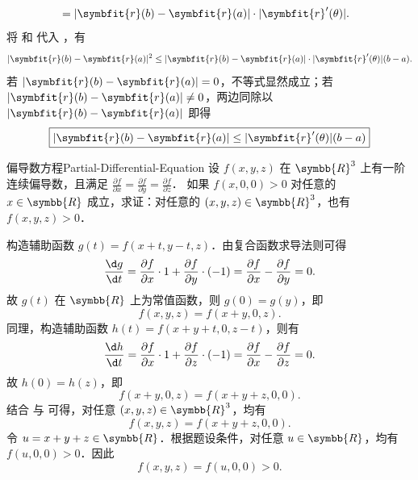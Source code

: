 \begin{myproof}
\begin{equation}
\begin{aligned}
                             & = |\symbfit{r}(b) - \symbfit{r}(a)| \cdot |\symbfit{r}'(\theta)|.
        \end{aligned} \label{eq:cauchy-schwarz}
    \end{equation}
    将  和  代入 ，有
    \begin{equation}
        |\symbfit{r}(b) - \symbfit{r}(a)|^2 \le |\symbfit{r}(b) - \symbfit{r}(a)| \cdot |\symbfit{r}'(\theta)| (b - a).
    \end{equation}
    若 $|\symbfit{r}(b) - \symbfit{r}(a)| = 0$，不等式显然成立；若 $|\symbfit{r}(b) - \symbfit{r}(a)| \ne 0$，两边同除以 $|\symbfit{r}(b) - \symbfit{r}(a)|$ 即得
    \begin{equation}
        \boxed{|\symbfit{r}(b) - \symbfit{r}(a)| \le |\symbfit{r}'(\theta)|(b - a)}
    \end{equation}
\end{myproof}


\begin{problem}{偏导数方程}{Partial-Differential-Equation}
    设 $f(x,y,z)$ 在 $\symbb{R}^3$ 上有一阶连续偏导数，且满足 $\frac{\partial f}{\partial x} = \frac{\partial f}{\partial y} = \frac{\partial f}{\partial z}$． 如果 $f(x,0,0) > 0$ 对任意的 $x \in \symbb{R}$ 成立，求证：对任意的 $(x,y,z) \in \symbb{R}^3$，也有 $f(x,y,z) > 0$．
\end{problem}

\begin{myproof}
    构造辅助函数 $g(t) = f(x+t, y-t, z)$．由复合函数求导法则可得
    \begin{equation}
        \frac{\d g}{\d t} = \frac{\partial f}{\partial x} \cdot 1 + \frac{\partial f}{\partial y} \cdot (-1) = \frac{\partial f}{\partial x} - \frac{\partial f}{\partial y} = 0.
    \end{equation}
    故 $g(t)$ 在 $\symbb{R}$ 上为常值函数，则 $g(0) = g(y)$，即
    \begin{equation}
        \label{eq:step1}
        f(x,y,z) = f(x+y, 0, z).
    \end{equation}
    同理，构造辅助函数 $h(t) = f(x+y+t, 0, z-t)$，则有
    \begin{equation}
        \frac{\d h}{\d t} = \frac{\partial f}{\partial x} \cdot 1 + \frac{\partial f}{\partial z} \cdot (-1) = \frac{\partial f}{\partial x} - \frac{\partial f}{\partial z} = 0.
    \end{equation}
    故 $h(0) = h(z)$，即
    \begin{equation}
        \label{eq:step2}
        f(x+y, 0, z) = f(x+y+z, 0, 0).
    \end{equation}
    结合  与  可得，对任意 $(x,y,z) \in \symbb{R}^3$，均有
    \begin{equation}
        f(x,y,z) = f(x+y+z, 0, 0).
    \end{equation}
    令 $u = x+y+z \in \symbb{R}$．根据题设条件，对任意 $u \in \symbb{R}$，均有 $f(u,0,0) > 0$．因此
    \begin{equation}
        f(x,y,z) = f(u, 0, 0) > 0.
    \end{equation}
\end{myproof}


